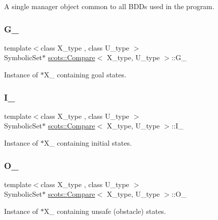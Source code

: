 A single manager object common to all B\+D\+Ds used in the program. \mbox{\label{classscots_1_1Compare_a1a7d912c19ff01269353ec705a257ad6}} 
\subsubsection{\texorpdfstring{G\+\_\+}{G\_}}
{\footnotesize\ttfamily template$<$class X\+\_\+type , class U\+\_\+type $>$ \\
Symbolic\+Set$\ast$ \hyperlink{classscots_1_1Compare}{scots\+::\+Compare}$<$ X\+\_\+type, U\+\_\+type $>$\+::G\+\_\+}

Instance of $\ast$\+X\+\_\+ containing goal states. \mbox{\label{classscots_1_1Compare_a32b383c4e137a371859fdee22c165486}} 
\subsubsection{\texorpdfstring{I\+\_\+}{I\_}}
{\footnotesize\ttfamily template$<$class X\+\_\+type , class U\+\_\+type $>$ \\
Symbolic\+Set$\ast$ \hyperlink{classscots_1_1Compare}{scots\+::\+Compare}$<$ X\+\_\+type, U\+\_\+type $>$\+::I\+\_\+}

Instance of $\ast$\+X\+\_\+ containing initial states. \mbox{\label{classscots_1_1Compare_a5dd50527db402893630c209d05be4ef0}} 
\subsubsection{\texorpdfstring{O\+\_\+}{O\_}}
{\footnotesize\ttfamily template$<$class X\+\_\+type , class U\+\_\+type $>$ \\
Symbolic\+Set$\ast$ \hyperlink{classscots_1_1Compare}{scots\+::\+Compare}$<$ X\+\_\+type, U\+\_\+type $>$\+::O\+\_\+}

Instance of $\ast$\+X\+\_\+ containing unsafe (obstacle) states. \mbox{\label{classscots_1_1Compare_ad18456a4cc253ae0d300cda74517e64b}} 
